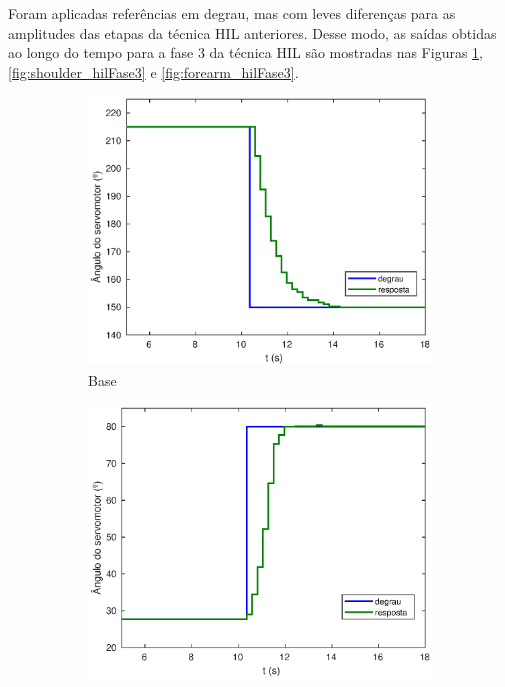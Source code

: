 Foram aplicadas referências em degrau, mas com leves diferenças para as amplitudes
das etapas da técnica HIL anteriores. Desse modo, as saídas obtidas ao longo do 
tempo para a fase 3 da técnica HIL são mostradas nas Figuras \ref{fig:base_hilFase3}, 
\ref{fig:shoulder_hilFase3} e \ref{fig:forearm_hilFase3}.

\begin{figure}[h!]
  
  \centering
  \begin{subfigure}{.5\textwidth}
    \centering
    \includegraphics[width = 1\columnwidth]{Imagens/base_hilFase3}
    \caption{Base}
    \label{fig:base_hilFase3}
  \end{subfigure}%
  \begin{subfigure}{.5\textwidth}
    \centering
    \includegraphics[width = 1\columnwidth]{Imagens/shoulder_hilFase3}

\end{subfigure}
\end{figure}

